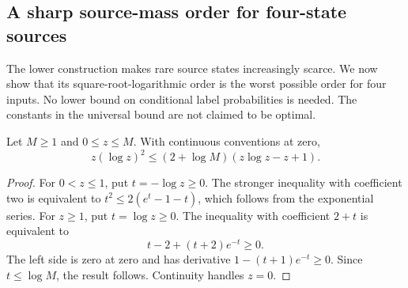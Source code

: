 \subsection{A sharp source-mass order for four-state sources}
\label{sec:sharp-source-mass}
The lower construction makes rare source states increasingly scarce. We now
show that its square-root-logarithmic order is the worst possible order for
four inputs. No lower bound on conditional label probabilities is needed.
The constants in the universal bound are not claimed to be optimal.

\begin{lemma}
\label{lem:log-moment}
Let $M\ge1$ and $0\le z\le M$. With continuous conventions at zero,
\[
 z(\log z)^2\le(2+\log M)(z\log z-z+1).
\]
\end{lemma}
\begin{proof}
For $0<z\le1$, put $t=-\log z\ge0$. The stronger inequality with
coefficient two is equivalent to
$t^2\le2(e^t-1-t)$, which follows from the exponential series.
For $z\ge1$, put $t=\log z\ge0$. The inequality with coefficient $2+t$
is equivalent to
\[
 t-2+(t+2)e^{-t}\ge0.
\]
The left side is zero at zero and has derivative
$1-(t+1)e^{-t}\ge0$. Since $t\le\log M$, the result follows.
Continuity handles $z=0$.
\end{proof}

